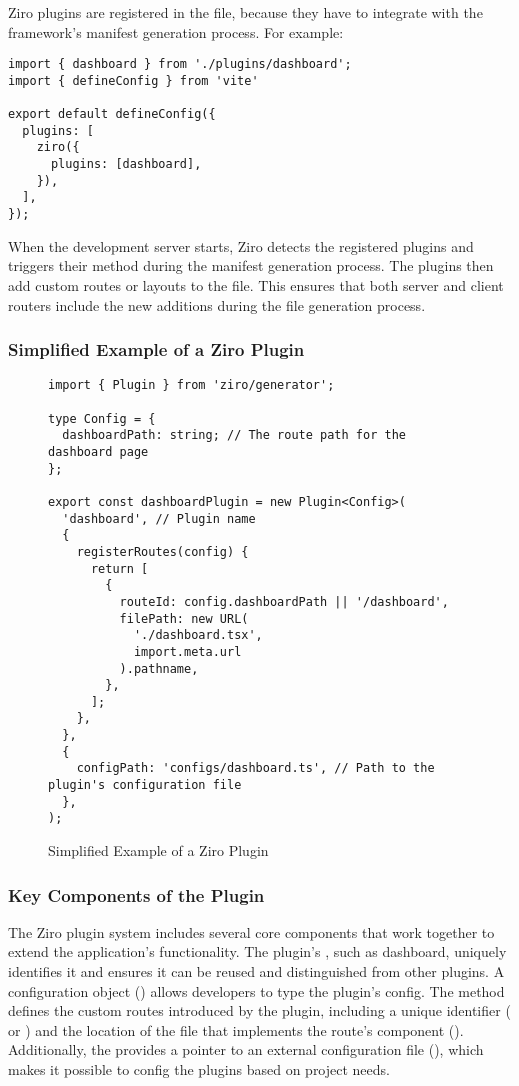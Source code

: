 Ziro plugins are registered in the  file, because they have to integrate with the framework’s manifest generation process. For example:
\begin{verbatim}
import { dashboard } from './plugins/dashboard';
import { defineConfig } from 'vite'

export default defineConfig({
  plugins: [
    ziro({
      plugins: [dashboard],
    }),
  ],
});
\end{verbatim}

When the development server starts, Ziro detects the registered plugins and triggers their  method during the manifest generation process. The plugins then add custom routes or layouts to the  file. This ensures that both server and client routers include the new additions during the file generation process.

\subsubsection{Simplified Example of a Ziro Plugin}
\begin{figure}[H]
  \begin{verbatim}
import { Plugin } from 'ziro/generator';

type Config = {
  dashboardPath: string; // The route path for the dashboard page
};

export const dashboardPlugin = new Plugin<Config>(
  'dashboard', // Plugin name
  {
    registerRoutes(config) {
      return [
        {
          routeId: config.dashboardPath || '/dashboard',
          filePath: new URL(
            './dashboard.tsx',
            import.meta.url
          ).pathname,
        },
      ];
    },
  },
  {
    configPath: 'configs/dashboard.ts', // Path to the plugin's configuration file
  },
);
  \end{verbatim}
  \caption{Simplified Example of a Ziro Plugin}
\end{figure}

\subsubsection{Key Components of the Plugin}
The Ziro plugin system includes several core components that work together to extend the application's functionality. The plugin’s , such as dashboard, uniquely identifies it and ensures it can be reused and distinguished from other plugins. A configuration object () allows developers to type the plugin’s config. The  method defines the custom routes introduced by the plugin, including a unique identifier ( or ) and the location of the file that implements the route’s component (). Additionally, the  provides a pointer to an external configuration file (), which makes it possible to config the plugins based on project needs.

